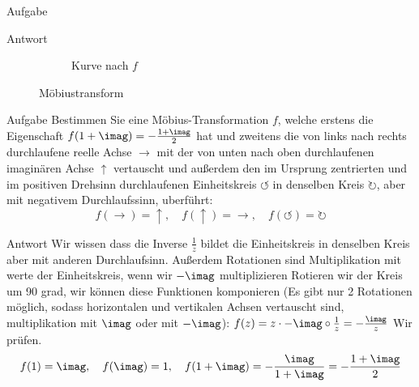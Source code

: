 \documentclass{scrartcl}
\let\*\cdot
\begin{document}
\begin{section}{Aufgabe}
\begin{subsection}{Antwort}
\begin{itemize}
\begin{figure}[H]
\begin{subfigure}{.47\textwidth}
\begin{tikzpicture}[x=2cm,y=2cm]
\end{tikzpicture}
  \caption{Kurve nach $f$}
\end{subfigure}
\caption{Möbiustransform}
\end{figure}





\end{itemize}
\end{subsection}
\end{section}
\begin{section}{Aufgabe}%
    Bestimmen Sie eine Möbius-Transformation $f$, welche erstens die Eigenschaft $f(1 + \imag) = -\frac{1+\imag}{2}$
hat und zweitens die von links nach rechts durchlaufene reelle Achse $\rightarrow$ mit der von unten nach oben durchlaufenen imaginären Achse $\uparrow$ vertauscht und außerdem den im
Ursprung zentrierten und im positiven Drehsinn durchlaufenen Einheitskreis $\circlearrowleft$ in denselben Kreis $\circlearrowright$, aber mit negativem Durchlaufssinn, uberführt: 
\[f(\rightarrow)=\uparrow,\quad f(\uparrow)=\rightarrow,\quad f(\circlearrowleft)=\circlearrowright\]
\end{section}
\begin{subsection}{Antwort}
    Wir wissen dass die Inverse $\frac{1}{z}$ bildet die Einheitskreis in denselben Kreis aber mit anderen Durchlaufsinn. Außerdem Rotationen sind Multiplikation mit werte der Einheitskreis, wenn wir $-\imag$ multiplizieren Rotieren wir der Kreis um 90 grad, wir können diese Funktionen komponieren (Es gibt nur 2 Rotationen möglich, sodass horizontalen und vertikalen Achsen vertauscht sind, multiplikation mit $\imag$ oder mit $-\imag$):
    $f(z)=z\*-\imag\circ \frac{1}{z}=-\frac{\imag}{z}$
    Wir prüfen.
    \[f(1)=\imag,\quad f(\imag)=1,\quad f(1+\imag)=-\frac{\imag}{1+\imag}=-\frac{1+\imag}{2}\]
\end{subsection}
\end{document}
